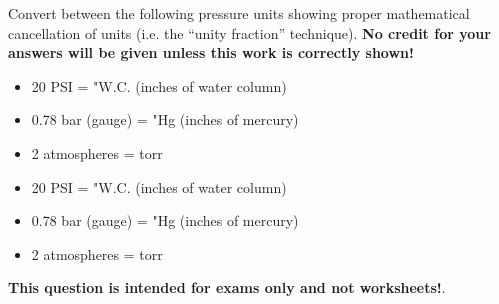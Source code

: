 

Convert between the following pressure units showing proper mathematical cancellation of units (i.e. the ``unity fraction'' technique).  {\bf No credit for your answers will be given unless this work is correctly shown!}

\begin{itemize}
\item{} 20 PSI = \underbar{\hskip 50pt} "W.C. (inches of water column)
\item{} 0.78 bar (gauge) = \underbar{\hskip 50pt} "Hg (inches of mercury)
\item{} 2 atmospheres = \underbar{\hskip 50pt} torr
\end{itemize}







\begin{itemize}
\item{} 20 PSI =  "W.C. (inches of water column)
\item{} 0.78 bar (gauge) =  "Hg (inches of mercury)
\item{} 2 atmospheres =  torr
\end{itemize}







{\bf This question is intended for exams only and not worksheets!}.



